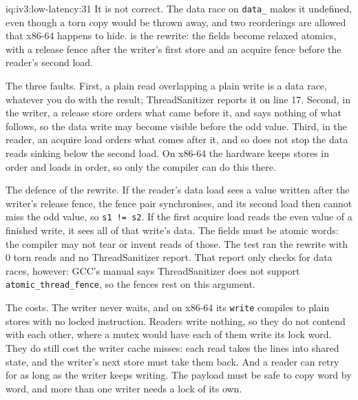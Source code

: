 \begin{solution}{iq:iv3:low-latency:31}
It is not correct. The data race on \texttt{data\_} makes it undefined, even though a torn copy would be thrown away, and two reorderings are allowed that x86-64 happens to hide.  is the rewrite: the fields become relaxed atomics, with a release fence after the writer's first store and an acquire fence before the reader's second load.
\label{lst:iv3:ll:seqfixed}

The three faults. First, a plain read overlapping a plain write is a data race, whatever you do with the result; ThreadSanitizer reports it on line 17. Second, in the writer, a release store orders what came before it, and says nothing of what follows, so the data write may become visible before the odd value. Third, in the reader, an acquire load orders what comes after it, and so does not stop the data reads sinking below the second load. On x86-64 the hardware keeps stores in order and loads in order, so only the compiler can do this there.

The defence of the rewrite. If the reader's data load sees a value written after the writer's release fence, the fence pair synchronises, and its second load then cannot miss the odd value, so \texttt{s1 != s2}. If the first acquire load reads the even value of a finished write, it sees all of that write's data. The fields must be atomic words: the compiler may not tear or invent reads of those. The test ran the rewrite with 0 torn reads and no ThreadSanitizer report. That report only checks for data races, however: GCC's manual says ThreadSanitizer does not support \texttt{atomic\_thread\_fence}, so the fences rest on this argument.

The costs. The writer never waits, and on x86-64 its \texttt{write} compiles to plain stores with no locked instruction. Readers write nothing, so they do not contend with each other, where a mutex would have each of them write its lock word. They do still cost the writer cache misses: each read takes the lines into shared state, and the writer's next store must take them back. And a reader can retry for as long as the writer keeps writing. The payload must be safe to copy word by word, and more than one writer needs a lock of its own.

\end{solution}

